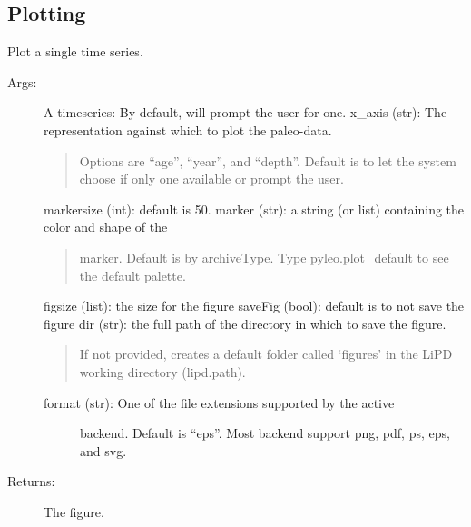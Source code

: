 \documentclass[letterpaper,10pt,english]{sphinxmanual}
\begin{document}
\subsection{Plotting}
\label{\detokenize{Main:plotting}}

\begin{fulllineitems}
\label{\detokenize{Main:pyleoclim.plotTs}}
Plot a single time series.
\begin{description}
\item[{Args:}] \leavevmode
A timeseries: By default, will prompt the user for one.
x\_axis (str): The representation against which to plot the paleo-data.
\begin{quote}

Options are “age”, “year”, and “depth”. Default is to let the
system choose if only one available or prompt the user.
\end{quote}

markersize (int): default is 50.
marker (str): a string (or list) containing the color and shape of the
\begin{quote}

marker. Default is by archiveType. Type pyleo.plot\_default to see
the default palette.
\end{quote}

figsize (list): the size for the figure
saveFig (bool): default is to not save the figure
dir (str): the full path of the directory in which to save the figure.
\begin{quote}

If not provided, creates a default folder called ‘figures’ in the
LiPD working directory (lipd.path).
\end{quote}
\begin{description}
\item[{format (str): One of the file extensions supported by the active}] \leavevmode
backend. Default is “eps”. Most backend support png, pdf, ps, eps,
and svg.

\end{description}

\item[{Returns:}] \leavevmode
The figure.

\end{description}

\end{fulllineitems}
\end{document}
